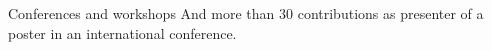 \documentclass{cv}
\newcommand\openbigstar[1][0.4]{%
  \scalerel*{%
    \stackinset{c}{-.125pt}{c}{}{\scalebox{#1}{\color{white}{$\bigstar$}}}{%
      $\bigstar$}%
  }{\bigstar}
}
\begin{document}
\begin{rubrique}{Conferences and workshops}
And more than 30 contributions as presenter of a poster in an international conference. \\






\end{rubrique}
\end{document}
